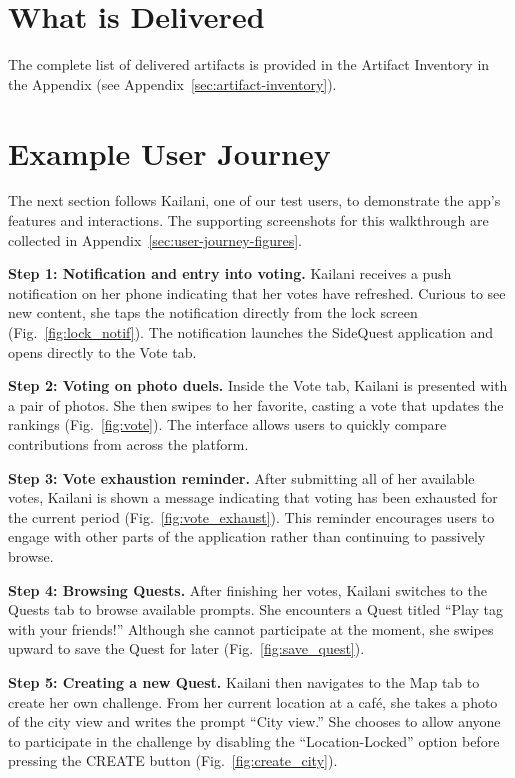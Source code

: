 \documentclass[12pt,a4paper,oneside]{report}
\begin{document}
\section{What is Delivered}
The complete list of delivered artifacts is provided in the Artifact Inventory in the Appendix (see Appendix~\ref{sec:artifact-inventory}).

\section{Example User Journey}

The next section follows Kailani, one of our test users, to demonstrate the app's features and interactions. The supporting screenshots for this walkthrough are collected in Appendix~\ref{sec:user-journey-figures}.

\textbf{Step 1: Notification and entry into voting.}
Kailani receives a push notification on her phone indicating that her votes have refreshed. Curious to see new content, she taps the notification directly from the lock screen (Fig.~\ref{fig:lock_notif}). The notification launches the SideQuest application and opens directly to the Vote tab.

\textbf{Step 2: Voting on photo duels.}
Inside the Vote tab, Kailani is presented with a pair of photos. She then swipes to her favorite, casting a vote that updates the rankings (Fig.~\ref{fig:vote}). The interface allows users to quickly compare contributions from across the platform.

\textbf{Step 3: Vote exhaustion reminder.}
After submitting all of her available votes, Kailani is shown a message indicating that voting has been exhausted for the current period (Fig.~\ref{fig:vote_exhaust}). This reminder encourages users to engage with other parts of the application rather than continuing to passively browse.

\textbf{Step 4: Browsing Quests.}
After finishing her votes, Kailani switches to the Quests tab to browse available prompts. She encounters a Quest titled “Play tag with your friends!” Although she cannot participate at the moment, she swipes upward to save the Quest for later  (Fig.~\ref{fig:save_quest}). 

\textbf{Step 5: Creating a new Quest.}
Kailani then navigates to the Map tab to create her own challenge. From her current location at a café, she takes a photo of the city view and writes the prompt “City view.” She chooses to allow anyone to participate in the challenge by disabling the “Location-Locked” option before pressing the CREATE button (Fig.~\ref{fig:create_city}).
\end{document}
